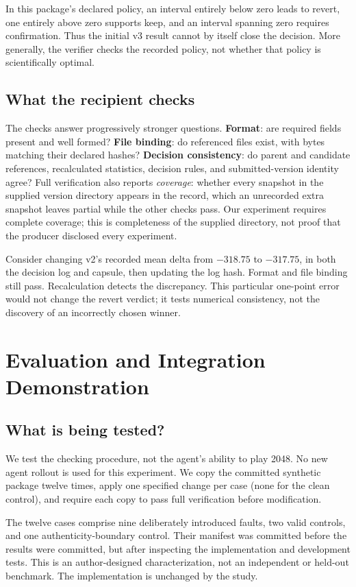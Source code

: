 \documentclass[conference]{IEEEtran}
\begin{document}
In this package's declared policy, an interval entirely below zero leads to revert, one entirely above zero supports keep, and an interval spanning zero requires confirmation. Thus the initial v3 result cannot by itself close the decision. More generally, the verifier checks the recorded policy, not whether that policy is scientifically optimal.

\subsection{What the recipient checks}
The checks answer progressively stronger questions. \textbf{Format}: are required fields present and well formed? \textbf{File binding}: do referenced files exist, with bytes matching their declared hashes? \textbf{Decision consistency}: do parent and candidate references, recalculated statistics, decision rules, and submitted-version identity agree? Full verification also reports \emph{coverage}: whether every snapshot in the supplied version directory appears in the record, which an unrecorded extra snapshot leaves partial while the other checks pass. Our experiment requires complete coverage; this is completeness of the supplied directory, not proof that the producer disclosed every experiment.

Consider changing v2's recorded mean delta from $-318.75$ to $-317.75$, in both the decision log and capsule, then updating the log hash. Format and file binding still pass. Recalculation detects the discrepancy. This particular one-point error would not change the revert verdict; it tests numerical consistency, not the discovery of an incorrectly chosen winner.

\section{Evaluation and Integration Demonstration}
\subsection{What is being tested?}
We test the checking procedure, not the agent's ability to play 2048. No new agent rollout is used for this experiment. We copy the committed synthetic package twelve times, apply one specified change per case (none for the clean control), and require each copy to pass full verification before modification.

The twelve cases comprise nine deliberately introduced faults, two valid controls, and one authenticity-boundary control. Their manifest was committed before the results were committed, but after inspecting the implementation and development tests. This is an author-designed characterization, not an independent or held-out benchmark. The implementation is unchanged by the study.
\end{document}
